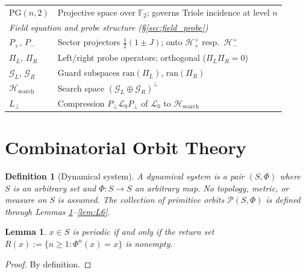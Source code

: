 \documentclass[12pt,a4paper]{article}
\newtheorem{lemma}[theorem]{Lemma}
\newtheorem{definition}[theorem]{Definition}
\theoremstyle{remark}
\begin{document}
\begin{longtable}{p{3.2cm}p{11cm}}
$\mathrm{PG}(n,2)$ & Projective space over $\mathbb{F}_2$; governs Triole incidence at level $n$\\[4pt]
%
\multicolumn{2}{l}{\textit{Field equation and probe structure (\S\ref{sec:field_probe})}}\\[2pt]
$P_+$, $P_-$ & Sector projectors $\tfrac{1}{2}(1\pm J)$; onto $\mathcal{H}^+_+$ resp.\ $\mathcal{H}^+_-$\\
$\Pi_L$, $\Pi_R$ & Left/right probe operators; orthogonal ($\Pi_L\Pi_R=0$)\\
$\mathcal{G}_L$, $\mathcal{G}_R$ & Guard subspaces $\mathrm{ran}(\Pi_L)$, $\mathrm{ran}(\Pi_R)$\\
$\mathcal{H}_{\mathrm{search}}$ & Search space $(\mathcal{G}_L\oplus\mathcal{G}_R)^\perp$\\
$L_\perp$ & Compression $P_\perp\mathcal{L}_0 P_\perp$ of $\mathcal{L}_0$ to $\mathcal{H}_{\mathrm{search}}$\\
\end{longtable}

\newpage

\section{Combinatorial Orbit Theory}
\label{sec:combinatorial}

\begin{definition}[Dynamical system]\label{def:D1}
A \emph{dynamical system} is a pair $(S,\Phi)$ where $S$ is an
arbitrary set and $\Phi:S\to S$ an arbitrary map.
No topology, metric, or measure on $S$ is assumed.
The collection of primitive orbits $\mathcal{P}(S,\Phi)$ is defined
through Lemmas \ref{lem:L1}--\ref{lem:L6}.
\end{definition}

\begin{lemma}\label{lem:L1}
$x\in S$ is \emph{periodic} if and only if the return set
$R(x):=\{n\ge1:\Phi^n(x)=x\}$ is nonempty.
\end{lemma}
\begin{proof}By definition.\end{proof}
\end{document}

